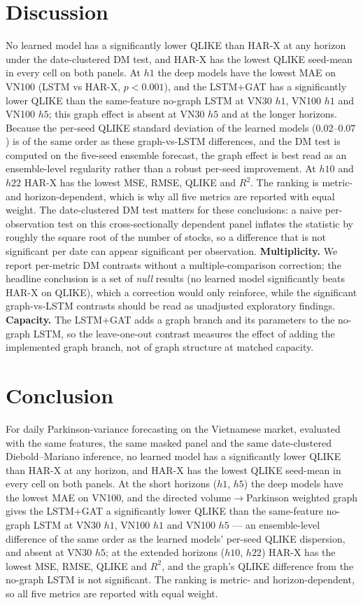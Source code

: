 \documentclass[runningheads]{llncs}
\begin{document}
\section{Discussion}\label{sec:disc}
No learned model has a significantly lower QLIKE than HAR-X at any horizon under the date-clustered DM test,
and HAR-X has the lowest QLIKE seed-mean in every cell on both panels. At $h1$ the deep models have the lowest
MAE on VN100 (LSTM vs HAR-X, $p<0.001$), and the LSTM+GAT has a significantly lower QLIKE than the same-feature
no-graph LSTM at VN30 $h1$, VN100 $h1$ and VN100 $h5$; this graph effect is absent at VN30 $h5$ and at the
longer horizons. Because the per-seed QLIKE standard deviation of the learned models ($0.02$--$0.07$) is of the
same order as these graph-vs-LSTM differences, and the DM test is computed on the five-seed ensemble forecast,
the graph effect is best read as an ensemble-level regularity rather than a robust per-seed improvement. At
$h10$ and $h22$ HAR-X has the lowest MSE, RMSE, QLIKE and $R^2$. The ranking is metric- and horizon-dependent,
which is why all five metrics are reported with equal weight. The date-clustered DM test matters for these
conclusions: a naive per-observation test on this cross-sectionally dependent panel inflates the statistic by
roughly the square root of the number of stocks, so a difference that is not significant per date can appear
significant per observation. \textbf{Multiplicity.} We report per-metric DM contrasts without a
multiple-comparison correction; the headline conclusion is a set of \emph{null} results (no learned model
significantly beats HAR-X on QLIKE), which a correction would only reinforce, while the significant
graph-vs-LSTM contrasts should be read as unadjusted exploratory findings. \textbf{Capacity.} The LSTM+GAT
adds a graph branch and its parameters to the no-graph LSTM, so the leave-one-out contrast measures the effect
of adding the implemented graph branch, not of graph structure at matched capacity.

\section{Conclusion}
For daily Parkinson-variance forecasting on the Vietnamese market, evaluated with the same features, the same
masked panel and the same date-clustered Diebold--Mariano inference, no learned model has a significantly lower
QLIKE than HAR-X at any horizon, and HAR-X has the lowest QLIKE seed-mean in every cell on both panels. At the
short horizons ($h1$, $h5$) the deep models have the lowest MAE on VN100, and the directed volume$\to$Parkinson
weighted graph gives the LSTM+GAT a significantly lower QLIKE than the same-feature no-graph LSTM at VN30 $h1$,
VN100 $h1$ and VN100 $h5$ --- an ensemble-level difference of the same order as the learned models' per-seed
QLIKE dispersion, and absent at VN30 $h5$; at the extended horizons ($h10$, $h22$) HAR-X has the lowest MSE,
RMSE, QLIKE and $R^2$, and the graph's QLIKE difference from the no-graph LSTM is not significant. The ranking
is metric- and horizon-dependent, so all five metrics are reported with equal weight.
\end{document}
